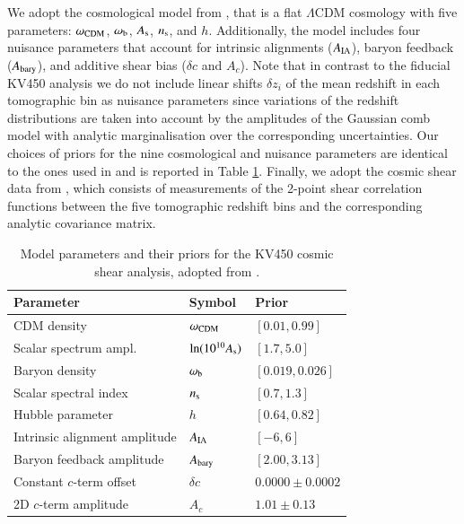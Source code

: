 \documentclass{aa}
\begin{document}
We adopt the cosmological model from \cite{hildebrandt18}, that is a flat $\Lambda$CDM cosmology with five parameters: $\omega_{\rm CDM}$, $\omega_{\rm b}$, $A_{\rm s}$, $n_{\rm s}$, and $h$. Additionally, the model includes four nuisance parameters that account for intrinsic alignments ($A_{\rm IA}$), baryon feedback ($A_{\rm bary}$), and additive shear bias ($\delta c$ and $A_c$). Note that in contrast to the fiducial KV450 analysis we do not include linear shifts $\delta z_i$ of the mean redshift in each tomographic bin as nuisance parameters since variations of the redshift distributions are taken into account by the amplitudes of the Gaussian comb model with analytic marginalisation over the corresponding uncertainties. Our choices of priors for the nine cosmological and nuisance parameters are identical to the ones used in \cite{hildebrandt18} and is reported in Table \ref{tab:priors}. Finally, we adopt the cosmic shear data from \cite{hildebrandt18}, which consists of measurements of the 2-point shear correlation functions between the five tomographic redshift bins and the corresponding analytic covariance matrix.
\begin{table}
\caption{Model parameters and their priors for the KV450 cosmic shear analysis, adopted from \cite{hildebrandt18}.}
\begin{tabular}{lll}
\hline
Parameter & Symbol & Prior\\
\hline
CDM density & $\omega_{\rm CDM}$ & $[0.01, 0.99]$\\
Scalar spectrum ampl. & $\ln(10^{10}A_{\rm s})$ & $[1.7, 5.0]$\\
Baryon density & $\omega_{\rm b}$ & $[0.019, 0.026]$ \\
Scalar spectral index & $n_{\rm s}$ & $[0.7, 1.3]$ \\
Hubble parameter & $h$ & $[0.64, 0.82]$ \\
\hline
Intrinsic alignment amplitude & $A_{\rm IA}$ & $[-6, 6]$\\
Baryon feedback amplitude & $A_{\rm bary}$ & $[2.00, 3.13]$\\
Constant $c$-term offset & $\delta c$ & $0.0000\pm0.0002$ \\
2D $c$-term amplitude & $A_c$ & $1.01\pm0.13$\\
\hline
\end{tabular}
\label{tab:priors}
\end{table}
\end{document}
